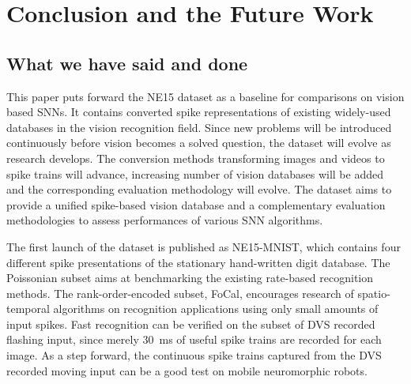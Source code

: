 \section{Conclusion and the Future Work}
\label{sec:summ}
\subsection{What we have said and done}
%
%

This paper puts forward the NE15 dataset as a baseline for comparisons on vision based SNNs.
It contains converted spike representations of existing widely-used databases in the vision recognition field.
Since new problems will be introduced continuously before vision becomes a solved question, the dataset will evolve as research develops. 
The conversion methods transforming images and videos to spike trains will advance, increasing number of vision databases will be added and the corresponding evaluation methodology will evolve.
The dataset aims to provide a unified spike-based vision database and a complementary evaluation methodologies to assess performances of various SNN algorithms.

The first launch of the dataset is published as NE15-MNIST, which contains four different spike presentations of the stationary hand-written digit database.
The Poissonian subset aims at benchmarking the existing rate-based recognition methods.
The rank-order-encoded subset, FoCal, encourages research of spatio-temporal algorithms on recognition applications using only small amounts of input spikes.
Fast recognition can be verified on the subset of DVS recorded flashing input, since merely 30~ms of useful spike trains are recorded for each image.
As a step forward, the continuous spike trains captured from the DVS recorded moving input can be a good test on mobile neuromorphic robots.

